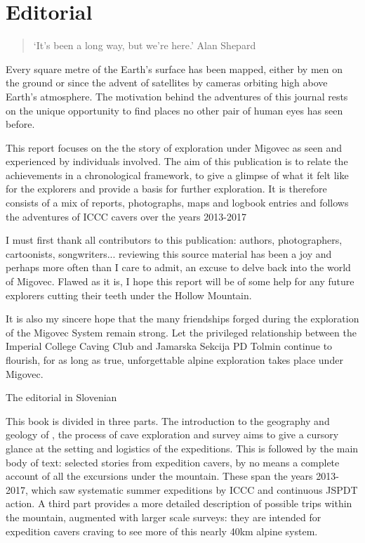 \chapter*{Editorial}

\begin{quote}
\centering
`It's been a long way, but we're here.' Alan Shepard
\end{quote}

Every square metre of the Earth's surface has been mapped, either by men on the ground or since the advent of satellites by cameras orbiting high above Earth's atmosphere. The motivation behind the adventures of this journal rests on the unique opportunity to find places no other pair of human eyes has seen before.

This report focuses on the the story of exploration under Migovec as seen and experienced by individuals involved. The aim of this publication is to relate the achievements in a chronological framework, to give a glimpse of what it felt like for the explorers and provide a basis for further exploration. It is therefore consists of a mix of reports, photographs, maps and logbook entries and follows the adventures of ICCC cavers over the years 2013-2017

I must first thank all contributors to this publication: authors, photographers, cartoonists, songwriters... reviewing this source material has been a joy and perhaps more often than I care to admit, an excuse to delve back into the world of Migovec. Flawed as it is, I hope this report will be of some help for any future explorers cutting their teeth under the Hollow Mountain. 

It is also my sincere hope that the many friendships forged during the exploration of the Migovec System remain strong. Let the privileged relationship between the Imperial College Caving Club and Jamarska Sekcija PD Tolmin continue to flourish, for as long as true, unforgettable alpine exploration takes place under Migovec.



\mydelimiter

The editorial in Slovenian

\mydelimiter

This book is divided in three parts. The introduction to the geography and geology of , the process of cave exploration and survey aims to give a cursory glance at the setting and logistics of the expeditions. This is followed by the main body of text: selected stories from expedition cavers, by no means a complete account of all the excursions under the mountain. These span the years 2013-2017, which saw systematic summer expeditions by ICCC and continuous JSPDT action. A third part provides a more detailed description of possible trips within the mountain, augmented with larger scale surveys: they are intended for expedition cavers craving to see more of this nearly 40km alpine system. 